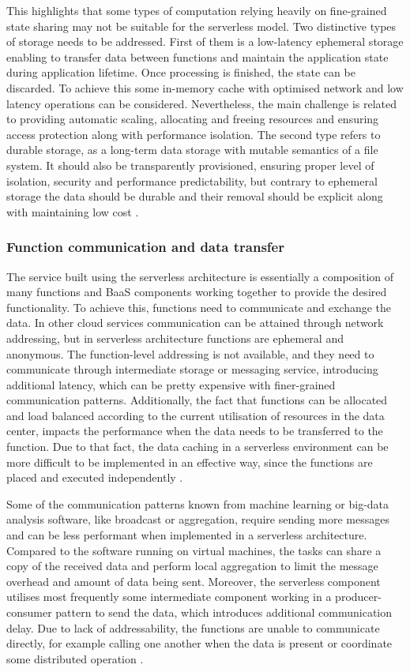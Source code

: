 This highlights that some types of computation relying heavily on fine-grained state sharing may not be suitable for the serverless model. Two distinctive types of storage needs to be addressed. First of them is a low-latency ephemeral storage enabling to transfer data between functions and maintain the application state during application lifetime. Once processing is finished, the state can be discarded. To achieve this some in-memory cache with optimised network and low latency operations can be considered. Nevertheless, the main challenge is related to providing automatic scaling, allocating and freeing resources and ensuring access protection along with performance isolation. The second type refers to durable storage, as a long-term data storage with mutable semantics of a file system. It should also be transparently provisioned, ensuring proper level of isolation, security and performance predictability, but contrary to ephemeral storage the data should be durable and their removal should be explicit along with maintaining low cost \cite{BerkeleyServerless}.

\subsubsection*{Function communication and data transfer}

The service built using the serverless architecture is essentially a composition of many functions and BaaS components working together to provide the desired functionality. To achieve this, functions need to communicate and exchange the data. In other cloud services communication can be attained through network addressing, but in serverless architecture functions are ephemeral and anonymous. The function-level addressing is not available, and they need to communicate through intermediate storage or messaging service, introducing additional latency, which can be pretty expensive with finer-grained communication patterns. Additionally, the fact that functions can be allocated and load balanced according to the current utilisation of resources in the data center, impacts the performance when the data needs to be transferred to the function. Due to that fact, the data caching in a serverless environment can be more difficult to be implemented in an effective way, since the functions are placed and executed independently \cite{ServerlessComputingSurveyOfOpportunitiesChallengesApplications}.

Some of the communication patterns known from machine learning or big-data analysis software, like broadcast or aggregation, require sending more messages and can be less performant when implemented in a serverless architecture. Compared to the software running on virtual machines, the tasks can share a copy of the received data and perform local aggregation to limit the message overhead and amount of data being sent. Moreover, the serverless component utilises most frequently some intermediate component working in a producer-consumer pattern to send the data, which introduces additional communication delay. Due to lack of addressability, the functions are unable to communicate directly, for example calling one another when the data is present or coordinate some distributed operation \cite{BerkeleyServerless}.

